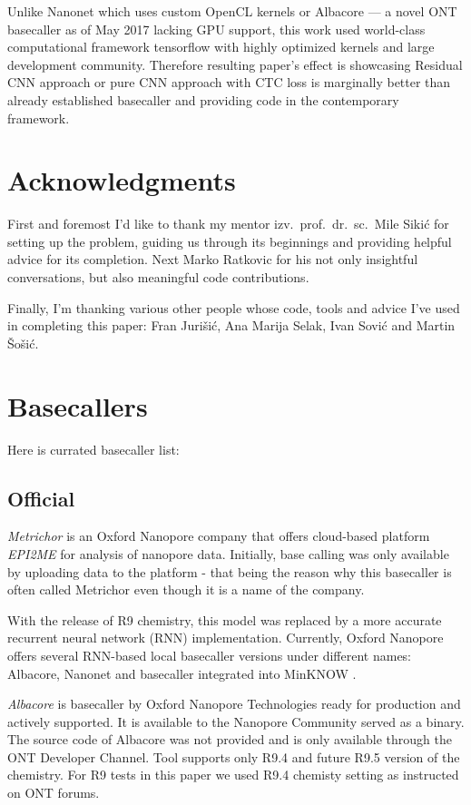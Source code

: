 \documentclass[runningheads,a4paper]{llncs}
\begin{document}
Unlike Nanonet which uses custom OpenCL kernels or Albacore --- a novel ONT basecaller as of May 2017 lacking GPU support, this work used world-class computational framework tensorflow with highly optimized kernels and large development community. Therefore resulting paper's effect is showcasing Residual CNN approach or pure CNN approach with CTC loss is marginally better than already established basecaller and providing code in the contemporary framework.

\section{Acknowledgments}

First and foremost I'd like to thank my mentor izv.~prof.~dr.~sc.~Mile Sikić for setting up the problem, guiding us through its beginnings and providing helpful advice for its completion. Next Marko Ratkovic for his not only insightful conversations, but also meaningful code contributions.

Finally, I'm thanking various other people whose code, tools and advice I've used in completing this paper: Fran Jurišić, Ana Marija Selak, Ivan Sović and Martin Šošić.




\appendix
\section{Basecallers}\label{app:basecallers}
Here is currated basecaller list:

\subsection{Official}
\textit{Metrichor} is an Oxford Nanopore company that offers cloud-based platform \textit{EPI2ME} for analysis of nanopore data.
Initially, base calling was only available by uploading data to the platform - that being the reason why this basecaller is often called Metrichor even though it is a name of the company.

With the release of R9 chemistry, this model was replaced by a more accurate recurrent neural network (RNN) implementation. Currently, Oxford Nanopore offers several RNN-based local basecaller versions under different names: Albacore, Nanonet and basecaller integrated into MinKNOW \cite{ont-basecallers}.

\textit{Albacore} is basecaller by Oxford Nanopore Technologies ready for production and actively supported.
It is available to the Nanopore Community served as a binary. The source code of Albacore was not provided and is only available through the ONT Developer Channel. Tool supports only R9.4 and future R9.5 version of the chemistry. For R9 tests in this paper we used R9.4 chemisty setting as instructed on ONT forums.
\end{document}
